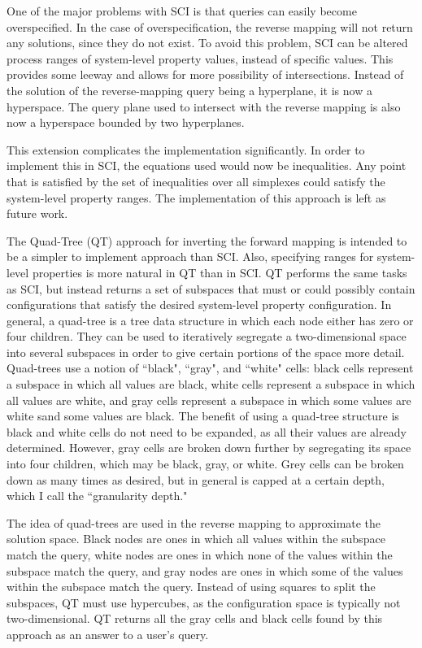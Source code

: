 One of the major problems with SCI is that queries can easily become overspecified.
In the case of overspecification, the reverse mapping will not return any solutions, since they do not exist.
To avoid this problem, SCI can be altered process ranges of system-level property values, instead of specific values.
This provides some leeway and allows for more possibility of intersections.
Instead of the solution of the reverse-mapping query being a hyperplane, it is now a hyperspace.
The query plane used to intersect with the reverse mapping is also now a hyperspace bounded by two hyperplanes.

This extension complicates the implementation significantly.
In order to implement this in SCI, the equations used would now be inequalities.
Any point that is satisfied by the set of inequalities over all simplexes could satisfy the system-level property ranges.
The implementation of this approach is left as future work.

The Quad-Tree (QT) approach for inverting the forward mapping is intended to be a simpler to implement approach than SCI.
Also, specifying ranges for system-level properties is more natural in QT than in SCI.
QT performs the same tasks as SCI, but instead returns a set of subspaces that must or could possibly contain configurations that satisfy the desired system-level property configuration.
In general, a quad-tree is a tree data structure in which each node either has zero or four children.
They can be used to iteratively segregate a two-dimensional space into several subspaces in order to give certain portions of the space more detail.
Quad-trees use a notion of ``black", ``gray", and ``white" cells: black cells represent a subspace in which all values are black, white cells represent a subspace in which all values are white, and gray cells represent a subspace in which some values are white sand some values are black.
The benefit of using a quad-tree structure is black and white cells do not need to be expanded, as all their values are already determined.
However, gray cells are broken down further by segregating its space into four children, which may be black, gray, or white.
Grey cells can be broken down as many times as desired, but in general is capped at a certain depth, which I call the ``granularity depth."

The idea of quad-trees are used in the reverse mapping to approximate the solution space.
Black nodes are ones in which all values within the subspace match the query,
white nodes are ones in which none of the values within the subspace match the query,
and gray nodes are ones in which some of the values within the subspace match the query.
Instead of using squares to split the subspaces, QT must use hypercubes, as the configuration space is typically not two-dimensional.
QT returns all the gray cells and black cells found by this approach as an answer to a user's query.

